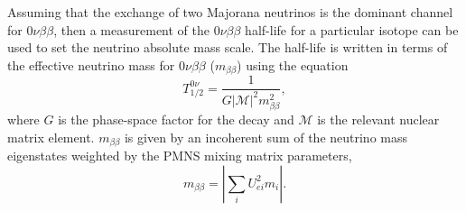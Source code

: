 Assuming that the exchange of two Majorana neutrinos is the dominant channel for $0\nu\beta\beta$, then a measurement of the $0\nu\beta\beta$ half-life for a particular isotope can be used to set the neutrino absolute mass scale. The half-life is written in terms of the effective neutrino mass for $0\nu\beta\beta$ ($m_{\beta\beta}$) using the equation 
\begin{equation}
    T^{0\nu}_{1/2}=\frac{1}{G|\mathcal{M}|^2m_{\beta\beta}^2},
\end{equation}
where $G$ is the phase-space factor for the decay and $\mathcal{M}$ is the relevant nuclear matrix element. $m_{\beta\beta}$ is given by an incoherent sum of the neutrino mass eigenstates weighted by the PMNS mixing matrix parameters,
\begin{equation}
    m_{\beta\beta}=|\sum_{i}U_{ei}^2m_i|.
    \label{eq:chap2-mbetabeta}
\end{equation}


